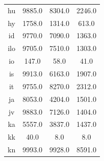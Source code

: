 \documentclass[11pt]{article}
\begin{document}
\begin{figure}[h]
\begin{tabular}{cccc}
hu&9885.0&8304.0&2246.0\\
hy&1758.0&1314.0&613.0\\
id&9770.0&7090.0&1363.0\\
ilo&9705.0&7510.0&1303.0\\
io&147.0&58.0&41.0\\
is&9913.0&6163.0&1907.0\\
it&9755.0&8270.0&2312.0\\
ja&8053.0&4204.0&1501.0\\
jv&9883.0&7126.0&1404.0\\
ka&5557.0&3837.0&1437.0\\
kk&40.0&8.0&8.0\\
kn&9993.0&9928.0&8591.0\\
\end{tabular}
\label{mism-tab}
\end{figure}
\clearpage
\end{document}
